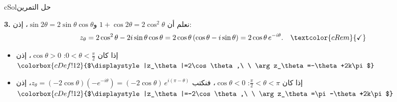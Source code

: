 \documentclass[12pt,a4paper]{article}
\newcounter{exo}
\newenvironment{hal}{\Needspace{12\baselineskip}\begin{otherlanguage}{english}\begin{arbox}[breakable]{cSol}{حل التمرين \theexo}}{\end{arbox}\end{otherlanguage}}
\newcommand{\bx}[1]{\ensuremath{\colorbox{cDef!12}{$\displaystyle #1$}}}
\newcommand{\QQ}[1]{\par\smallskip\textbf{#1.} }
\begin{document}
\begin{hal}
\QQ{3} نعلم أن $1+\cos2\theta=2\cos^2\theta$ و$\sin2\theta=2\sin\theta\cos\theta$، إذن:
\[z_\theta=2\cos^2\theta-2i\sin\theta\cos\theta=2\cos\theta\left(\cos\theta-i\sin\theta\right)=2\cos\theta\, e^{-i\theta}.\quad\textcolor{cRem}{\checkmark}\]
\begin{itemize}
\item إذا كان $0<\theta<\frac{\pi}{2}$: $\cos\theta>0$، إذن \bx{|z_\theta|=2\cos\theta,\ \ \arg z_\theta=-\theta+2k\pi}
\item إذا كان $\frac{\pi}{2}<\theta<\pi$: $\cos\theta<0$، فنكتب $z_\theta=(-2\cos\theta)\left(-e^{-i\theta}\right)=(-2\cos\theta)\,e^{i(\pi-\theta)}$، إذن
\bx{|z_\theta|=-2\cos\theta,\ \ \arg z_\theta=\pi-\theta+2k\pi}
\end{itemize}
\end{hal}
\end{document}
